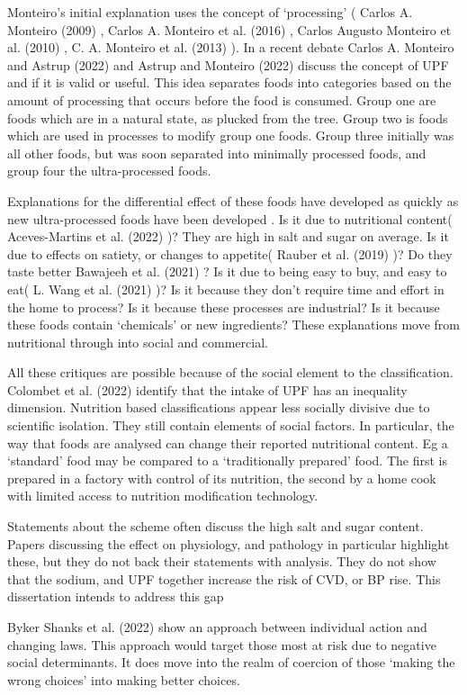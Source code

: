 \documentclass[
]{article}
\begin{document}
Monteiro's initial explanation uses the concept of `processing' ( Carlos
A. Monteiro (2009) , Carlos A. Monteiro et al. (2016) , Carlos Augusto
Monteiro et al. (2010) , C. A. Monteiro et al. (2013) ). In a recent
debate Carlos A. Monteiro and Astrup (2022) and Astrup and Monteiro
(2022) discuss the concept of UPF and if it is valid or useful. This
idea separates foods into categories based on the amount of processing
that occurs before the food is consumed. Group one are foods which are
in a natural state, as plucked from the tree. Group two is foods which
are used in processes to modify group one foods. Group three initially
was all other foods, but was soon separated into minimally processed
foods, and group four the ultra-processed foods.

Explanations for the differential effect of these foods have developed
as quickly as new ultra-processed foods have been developed . Is it due
to nutritional content( Aceves-Martins et al. (2022) )? They are high in
salt and sugar on average. Is it due to effects on satiety, or changes
to appetite( Rauber et al. (2019) )? Do they taste better Bawajeeh et
al. (2021) ? Is it due to being easy to buy, and easy to eat( L. Wang et
al. (2021) )? Is it because they don't require time and effort in the
home to process? Is it because these processes are industrial? Is it
because these foods contain `chemicals' or new ingredients? These
explanations move from nutritional through into social and commercial.

All these critiques are possible because of the social element to the
classification. Colombet et al. (2022) identify that the intake of UPF
has an inequality dimension. Nutrition based classifications appear less
socially divisive due to scientific isolation. They still contain
elements of social factors. In particular, the way that foods are
analysed can change their reported nutritional content. Eg a `standard'
food may be compared to a `traditionally prepared' food. The first is
prepared in a factory with control of its nutrition, the second by a
home cook with limited access to nutrition modification technology.

Statements about the scheme often discuss the high salt and sugar
content. Papers discussing the effect on physiology, and pathology in
particular highlight these, but they do not back their statements with
analysis. They do not show that the sodium, and UPF together increase
the risk of CVD, or BP rise. This dissertation intends to address this
gap

Byker Shanks et al. (2022) show an approach between individual action
and changing laws. This approach would target those most at risk due to
negative social determinants. It does move into the realm of coercion of
those `making the wrong choices' into making better choices.
\end{document}
